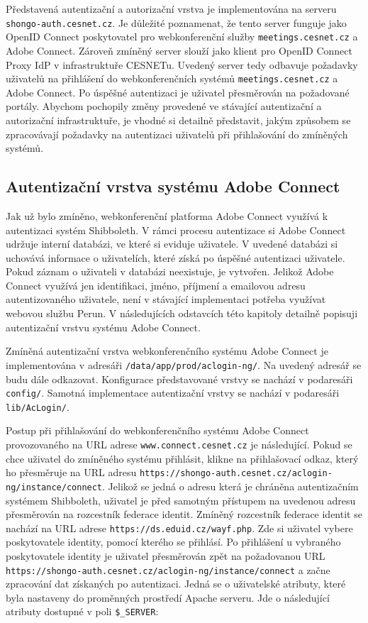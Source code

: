 \documentclass[
  printed, %
  twoside, %
  table,   %
  nolof,     %
  nolot,     %
]{fithesis3}
\begin{document}
Představená autentizační a autorizační vrstva je implementována na serveru \texttt{shongo-auth.cesnet.cz}. Je důležité poznamenat, že tento server funguje jako OpenID Connect poskytovatel pro webkonferenční služby \texttt{meetings.cesnet.cz} a Adobe Connect. Zároveň zmíněný server slouží jako klient pro OpenID Connect Proxy IdP v infrastruktuře CESNETu. Uvedený server tedy odbavuje požadavky uživatelů na přihlášení do webkonferenčních systémů \texttt{meetings.cesnet.cz} a Adobe Connect. Po úspěšné autentizaci je uživatel přesměrován na požadované portály. Abychom pochopily změny provedené ve stávající autentizační a autorizační infrastruktuře, je vhodné si detailně představit, jakým způsobem se zpracovávají požadavky na autentizaci uživatelů při přihlašování do zmíněných systémů.  

\subsection{Autentizační vrstva systému Adobe Connect}
\label{ac-old}
Jak už bylo zmíněno, webkonferenční platforma Adobe Connect využívá k autentizaci systém Shibboleth. V rámci procesu autentizace si Adobe Connect udržuje interní databázi, ve které si eviduje uživatele. V uvedené databázi si uchovává informace o uživatelích,
které získá po úspěšné autentizaci uživatele. Pokud záznam o uživateli
v databázi neexistuje, je vytvořen. Jelikož Adobe Connect využívá jen
identifikaci, jméno, příjmení a emailovou adresu autentizovaného uživatele, není v stávající implementaci
potřeba využívat webovou službu Perun. V následujících odstavcích této kapitoly detailně popisuji autentizační vrstvu systému Adobe Connect. \par

Zmíněná autentizační vrstva webkonferenčního systému Adobe Connect je implementována v adresáři \texttt{/data/app/prod/aclogin-ng/}. Na uvedený adresář se budu dále odkazovat. Konfigurace představované vrstvy se nachází v podaresáři \texttt{config/}. Samotná implementace autentizační vrstvy se nachází v podaresáři \texttt{lib/AcLogin/}. \par

Postup při přihlašování do webkonferenčního systému Adobe Connect provozovaného na URL adrese \texttt{www.connect.cesnet.cz} je následující. Pokud se chce uživatel do zmíněného systému přihlásit, klikne na přihlašovací odkaz, který ho přesměruje na URL adresu \texttt{https://shongo-auth.cesnet.cz/aclogin-ng/instance/connect}. Jelikož se jedná o adresu která je chráněna autentizačním systémem Shibboleth, uživatel je před samotným přístupem na uvedenou adresu přesměrován na rozcestník federace identit. Zmíněný rozcestník federace identit se nachází na URL adrese \texttt{https://ds.eduid.cz/wayf.php}. Zde si uživatel vybere poskytovatele identity, pomocí kterého se přihlásí. Po přihlášení u vybraného poskytovatele identity je uživatel  přesměrován zpět na požadovanou URL \texttt{https://shongo-auth.cesnet.cz/aclogin-ng/instance/connect} a začne zpracování dat získaných po autentizaci. Jedná se o uživatelské atributy, které byla nastaveny do proměnných prostředí Apache serveru. Jde o následující atributy dostupné v poli \texttt{\$\_SERVER}: 
\end{document}
